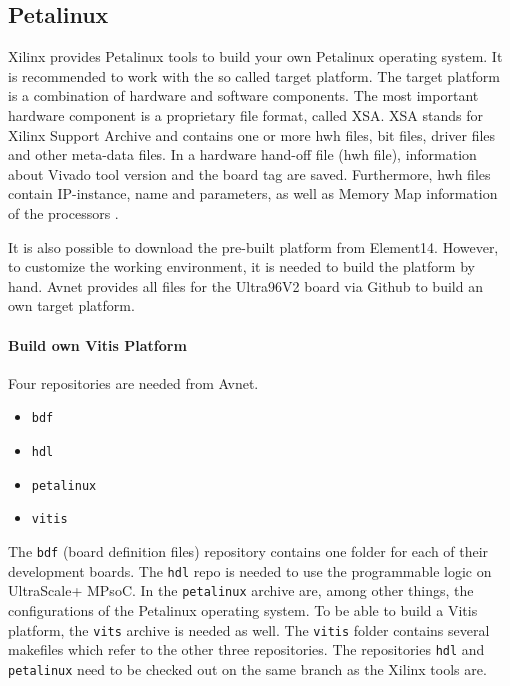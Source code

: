 \subsection{Petalinux}
\label{subsec:embedded_platform:operating_systems:petalinux}

Xilinx provides Petalinux tools to build your own Petalinux operating system.
It is recommended to work with the so called target platform.
The target platform is a combination of hardware and software components.
The most important hardware component is a proprietary file format, called XSA.
XSA stands for Xilinx Support Archive and contains one or more hwh files, bit files, driver files and other meta-data files.
In a hardware hand-off file (hwh file), information about Vivado tool version and the board tag are saved.
Furthermore, hwh files contain IP-instance, name and parameters, as well as Memory Map information of the processors \cite{vitis_user_guide}.

It is also possible to download the pre-built platform from Element14.
However, to customize the working environment, it is needed to build the platform by hand.
Avnet provides all files for the Ultra96V2 board via Github to build an own target platform.

\paragraph{Build own Vitis Platform}
Four repositories are needed from Avnet.
\begin{itemize}
	\item \texttt{bdf}
	\item \texttt{hdl}
	\item \texttt{petalinux}
	\item \texttt{vitis}
\end{itemize}

The \texttt{bdf} (board definition files) repository contains one folder for each of their development boards.
The \texttt{hdl} repo is needed to use the programmable logic on UltraScale+ MPsoC.
In the \texttt{petalinux} archive are, among other things, the configurations of the Petalinux operating system.
To be able to build a Vitis platform, the \texttt{vits} archive is needed as well.
The \texttt{vitis} folder contains several makefiles which refer to the other three repositories.
The repositories \texttt{hdl} and \texttt{petalinux} need to be checked out on the same branch as the Xilinx tools are.

